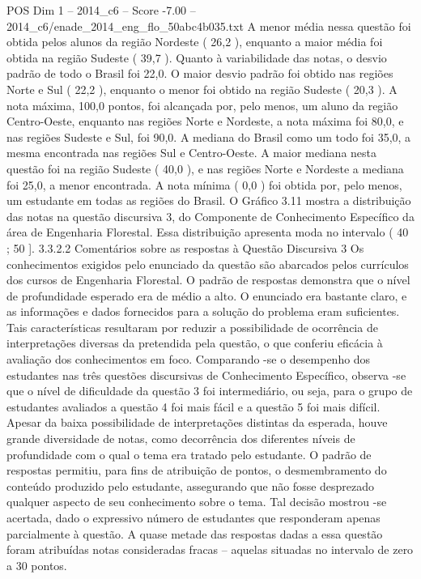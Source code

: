 \begin{textsample}{POS Dim 1 – 2014\_c6 – Score -7.00 – 2014\_c6/enade\_2014\_eng\_flo\_50abc4b035.txt}
A menor média nessa questão foi obtida pelos alunos da região Nordeste ( 26,2 ), enquanto a maior média foi obtida na região Sudeste ( 39,7 ).
Quanto à variabilidade das notas, o desvio padrão de todo o Brasil foi 22,0.
O maior desvio padrão foi obtido nas regiões Norte e Sul ( 22,2 ), enquanto o menor foi obtido na região Sudeste ( 20,3 ).
A nota máxima, 100,0 pontos, foi alcançada por, pelo menos, um aluno da região Centro-Oeste, enquanto nas regiões Norte e Nordeste, a nota máxima foi 80,0, e nas regiões Sudeste e Sul, foi 90,0.
A mediana do Brasil como um todo foi 35,0, a mesma encontrada nas regiões Sul e Centro-Oeste.
A maior mediana nesta questão foi na região Sudeste ( 40,0 ), e nas regiões Norte e Nordeste a mediana foi 25,0, a menor encontrada.
A nota mínima ( 0,0 ) foi obtida por, pelo menos, um estudante em todas as regiões do Brasil.
O Gráfico 3.11 mostra a distribuição das notas na questão discursiva 3, do Componente de Conhecimento Específico da área de Engenharia Florestal.
Essa distribuição apresenta moda no intervalo ( 40 ; 50 ]. 3.3.2.2 Comentários sobre as respostas à Questão Discursiva 3 Os conhecimentos exigidos pelo enunciado da questão são abarcados pelos currículos dos cursos de Engenharia Florestal.
O padrão de respostas demonstra que o nível de profundidade esperado era de médio a alto.
O enunciado era bastante claro, e as informações e dados fornecidos para a solução do problema eram suficientes.
Tais características resultaram por reduzir a possibilidade de ocorrência de interpretações diversas da pretendida pela questão, o que conferiu eficácia à avaliação dos conhecimentos em foco.
Comparando -se o desempenho dos estudantes nas três questões discursivas de Conhecimento Específico, observa -se que o nível de dificuldade da questão 3 foi intermediário, ou seja, para o grupo de estudantes avaliados a questão 4 foi mais fácil e a questão 5 foi mais difícil.
Apesar da baixa possibilidade de interpretações distintas da esperada, houve grande diversidade de notas, como decorrência dos diferentes níveis de profundidade com o qual o tema era tratado pelo estudante.
O padrão de respostas permitiu, para fins de atribuição de pontos, o desmembramento do conteúdo produzido pelo estudante, assegurando que não fosse desprezado qualquer aspecto de seu conhecimento sobre o tema.
Tal decisão mostrou -se acertada, dado o expressivo número de estudantes que responderam apenas parcialmente à questão.
A quase metade das respostas dadas a essa questão foram atribuídas notas consideradas fracas – aquelas situadas no intervalo de zero a 30 pontos.

\end{textsample}
